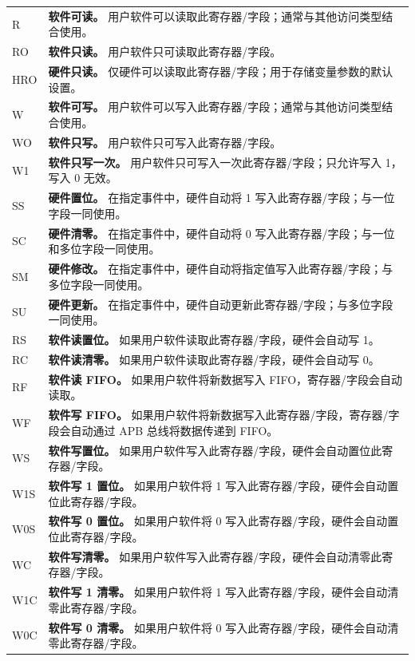 \begin{longtable}[c]{ R{1cm} p{13cm} }

R & \textbf{软件可读。} 
	用户软件可以读取此寄存器/字段；通常与其他访问类型结合使用。 \\
RO & \textbf{软件只读。} 
	用户软件只可读取此寄存器/字段。 \\
HRO & \textbf{硬件只读。} 
	仅硬件可以读取此寄存器/字段；用于存储变量参数的默认设置。 \\
W & \textbf{软件可写。} 
	用户软件可以写入此寄存器/字段；通常与其他访问类型结合使用。 \\
WO & \textbf{软件只写。} 
	用户软件只可写入此寄存器/字段。 \\
W1 & \textbf{软件只写一次。} 
	用户软件只可写入一次此寄存器/字段；只允许写入 1，写入 0 无效。 \\

SS & \textbf{硬件置位。} 
	在指定事件中，硬件自动将 1 写入此寄存器/字段；与一位字段一同使用。 \\
SC & \textbf{硬件清零。} 
	在指定事件中，硬件自动将 0 写入此寄存器/字段；与一位和多位字段一同使用。 \\
SM & \textbf{硬件修改。} 
	在指定事件中，硬件自动将指定值写入此寄存器/字段；与多位字段一同使用。 \\
SU & \textbf{硬件更新。} 
	在指定事件中，硬件自动更新此寄存器/字段；与多位字段一同使用。 \\

RS & \textbf{软件读置位。} 
	如果用户软件读取此寄存器/字段，硬件会自动写 1。 \\
RC & \textbf{软件读清零。} 
	如果用户软件读取此寄存器/字段，硬件会自动写 0。 \\
RF & \textbf{软件读 FIFO。} 
	如果用户软件将新数据写入 FIFO，寄存器/字段会自动读取。 \\

WF & \textbf{软件写 FIFO。} 
	如果用户软件将新数据写入此寄存器/字段，寄存器/字段会自动通过 APB 总线将数据传递到 FIFO。 \\

WS & \textbf{软件写置位。} 
	如果用户软件写入此寄存器/字段，硬件会自动置位此寄存器/字段。 \\
W1S & \textbf{软件写 1 置位。} 
	如果用户软件将 1 写入此寄存器/字段，硬件会自动置位此寄存器/字段。 \\
W0S & \textbf{软件写 0 置位。} 
	如果用户软件将 0 写入此寄存器/字段，硬件会自动置位此寄存器/字段。 \\

WC & \textbf{软件写清零。} 
	如果用户软件写入此寄存器/字段，硬件会自动清零此寄存器/字段。 \\
W1C & \textbf{软件写 1 清零。} 
	如果用户软件将 1 写入此寄存器/字段，硬件会自动清零此寄存器/字段。 \\
W0C & \textbf{软件写 0 清零。} 
	如果用户软件将 0 写入此寄存器/字段，硬件会自动清零此寄存器/字段。 \\


\end{longtable}
